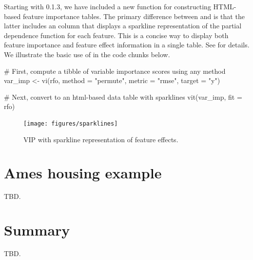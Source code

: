 Starting with  0.1.3, we have included a new function  for constructing HTML-based feature importance tables. The primary difference between  and  is that the latter includes an  column that displays a sparkline representation of the partial dependence function for each feature. This is a concise way to display both feature importance and feature effect information in a single table. See  for details. We illustrate the basic use of  in the code chunks below.

\begin{example}
# First, compute a tibble of variable importance scores using any method
var_imp <- vi(rfo, method = "permute", metric = "rmse", target = "y")

# Next, convert to an html-based data table with sparklines
vit(var_imp, fit = rfo)
\end{example}

\begin{figure}[!htb]
  \centering 
  \texttt{[image: figures/sparklines]} 
  \caption{VIP with sparkline representation of feature effects.}
  \label{fig:sparklines}
\end{figure}


\section{Ames housing example}

TBD.


\section{Summary}

TBD.




\address{Brandon M. Greenwell\\
  Department of Mathematics and Statistics\\
  Wright State University\\
  3640 Colonel Glenn Hwy\\ 
  Dayton, OH 45435\\
  United States of America\\
  ORCiD: \href{https://orcid.org/0000-0002-8120-0084}{0000-0002-8120-0084}\\
  }

\address{Bradley C. Boehmke\\
  University of Cincinnati\\
  2925 Campus Green Dr\\
  Cincinnati, OH 45221\\
  United States of America\\
  ORCiD: \href{https://orcid.org/0000-0002-3611-8516}{0000-0002-3611-8516}\\
  }
